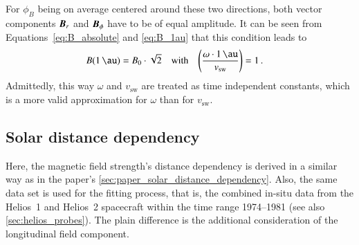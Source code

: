 For $\phi_B$ being on average centered around these two directions, both vector components $\boldsymbol{B}_r$ and $\boldsymbol{B}_\phi$ have to be of equal amplitude. It can be seen from Equations~\ref{eq:B_absolute} and \ref{eq:B_1au} that this condition leads to
\begin{align}
	B(\SI{1}{\au}) &= B_0 \cdot \sqrt{2}	&\text{with}	&	&	\left(\frac{\omega\cdot\SI{1}{\au}}{v_\text{sw}}\right) &= 1\,.
\end{align}
Admittedly, this way $\omega$ and $v_\text{sw}$ are treated as time independent constants, which is a more valid approximation for $\omega$ than for $v_\text{sw}$.

\subsection{Solar distance dependency}
Here, the magnetic field strength's distance dependency is derived in a similar way as in the paper's \autoref{sec:paper_solar_distance_dependency}. Also, the same data set is used for the fitting process, that is, the combined in-situ data from the Helios~1 and Helios~2 spacecraft within the time range 1974--1981 (see also \autoref{sec:helios_probes}). The plain difference is the additional consideration of the longitudinal field component.


